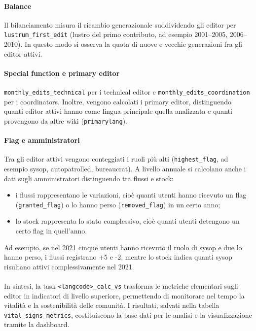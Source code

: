 \paragraph{Balance}  
Il bilanciamento misura il ricambio generazionale suddividendo gli editor per \texttt{lustrum\_first\allowbreak\_edit} (lustro del primo contributo, ad esempio 2001--2005, 2006--2010). 
In questo modo si osserva la quota di nuove e vecchie generazioni fra gli editor attivi.

\paragraph{Special function e primary editor}  
\texttt{monthly\_edits\_technical} per i technical editor e \texttt{monthly\allowbreak\_edits\_coordination} per i coordinators. 
Inoltre, vengono calcolati i primary editor, distinguendo quanti editor attivi hanno come lingua principale quella analizzata e quanti provengono da altre wiki (\texttt{primarylang}).

\paragraph{Flag e amministratori}  
Tra gli editor attivi vengono conteggiati i ruoli più alti (\texttt{highest\_flag}, ad esempio sysop, autopatrolled, bureaucrat). 
A livello annuale si calcolano anche i dati sugli amministratori distinguendo tra flussi e stock:  
\begin{itemize}
  \item i flussi rappresentano le variazioni, cioè quanti utenti hanno ricevuto un flag (\texttt{granted\_flag}) o lo hanno perso (\texttt{removed\_flag}) in un certo anno;  
  \item lo stock rappresenta lo stato complessivo, cioè quanti utenti detengono un certo flag in quell’anno.  
\end{itemize}
Ad esempio, se nel 2021 cinque utenti hanno ricevuto il ruolo di sysop e due lo hanno perso, i flussi registrano +5 e -2, mentre lo stock indica quanti sysop risultano attivi complessivamente nel 2021.

\paragraph{}  
In sintesi, la task \texttt{<langcode>\_calc\_vs} trasforma le metriche elementari sugli editor in indicatori di livello superiore, permettendo di monitorare nel tempo la vitalità e la sostenibilità delle comunità. I risultati, salvati nella tabella \texttt{vital\_signs\_metrics}, costituiscono la base dati per le analisi e la visualizzazione tramite la dashboard.

